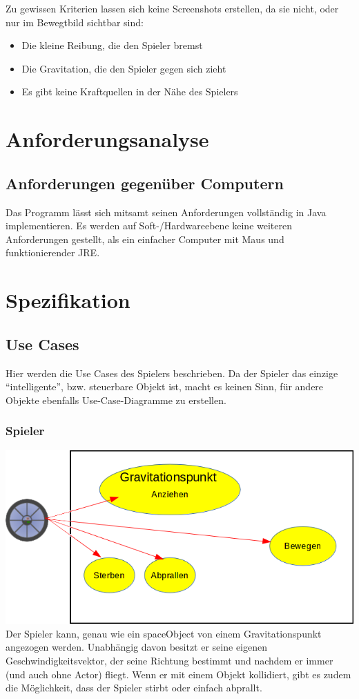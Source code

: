 \documentclass[12pt,a4paper]{scrartcl}
\newcommand{\q}[1]{``#1''}
\begin{document}
Zu gewissen Kriterien lassen sich keine Screenshots erstellen, da sie nicht,
oder nur im Bewegtbild sichtbar sind:
\begin{itemize}
\item Die kleine Reibung, die den Spieler bremst
\item Die Gravitation, die den Spieler gegen sich zieht
\item Es gibt keine Kraftquellen in der Nähe des Spielers
\end{itemize}

\section{Anforderungsanalyse}
\subsection{Anforderungen gegenüber Computern}
Das Programm lässt sich mitsamt seinen Anforderungen vollständig in Java implementieren.
Es werden auf Soft-/Hardwareebene keine weiteren Anforderungen gestellt, als ein einfacher Computer mit
Maus und funktionierender JRE.


\section{Spezifikation}
\subsection{Use Cases}
Hier werden die Use Cases des Spielers beschrieben. Da der Spieler das einzige \q{intelligente}, bzw.
steuerbare Objekt ist, macht es keinen Sinn, für andere Objekte ebenfalls Use-Case-Diagramme zu erstellen.
\subsubsection{Spieler}
\includegraphics[scale=0.7]{use_cases/spieler.png}\\
Der Spieler kann, genau wie ein spaceObject von einem Gravitationspunkt angezogen werden. Unabhängig davon besitzt er seine eigenen Geschwindigkeitsvektor, der seine Richtung bestimmt und nachdem er immer (und auch ohne Actor) fliegt. Wenn er mit einem Objekt kollidiert, gibt es zudem die Möglichkeit, dass der Spieler
stirbt oder einfach abprallt.
\end{document}

